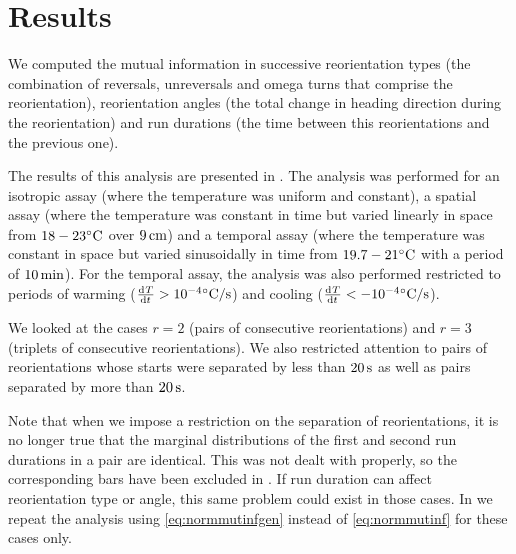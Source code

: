 \documentclass[12pt]{article}
\begin{document}
\section{Results}\label{sec:results}

We computed the mutual information in successive reorientation types (the combination of reversals, unreversals and omega turns that comprise the reorientation), reorientation angles (the total change in heading direction during the reorientation)  and run durations (the time between this reorientations and the previous one).

The results of this analysis are presented in . The analysis was performed for an isotropic assay (where the temperature was uniform and constant), a spatial assay (where the temperature was constant in time but varied linearly in space from $18-23^\circ\mathrm{C}$ over $9\,\mathrm{cm}$) and a temporal assay (where the temperature was constant in space but varied sinusoidally in time from $19.7-21^\circ\mathrm{C}$ with a period of $10\,\mathrm{min}$). For the temporal assay, the analysis was also performed restricted to periods of warming ($\diff{T}{t} > 10^{-4}\mbox{}\dC/\mathrm{s}$) and cooling ($\diff{T}{t} < -10^{-4}\mbox{}\dC/\mathrm{s}$).

We looked at the cases $r=2$ (pairs of consecutive reorientations) and $r=3$ (triplets of consecutive reorientations). We also restricted attention to pairs of reorientations whose starts were separated by less than $20\,\mathrm{s}$ as well as pairs separated by more than $20\,\mathrm{s}$.

Note that when we impose a restriction on the separation of reorientations, it is no longer true that the marginal distributions of the first and second run durations in a pair are identical. This was not dealt with properly, so the corresponding bars have been excluded in . If run duration can affect reorientation type or angle, this same problem could exist in those cases. In  we repeat the analysis using \eqref{eq:normmutinfgen} instead of \eqref{eq:normmutinf} for these cases only.
\end{document}
